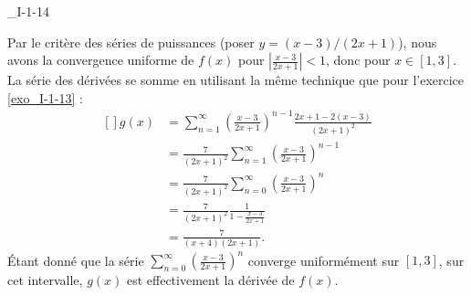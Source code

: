 

\begin{corrige}{_I-1-14}

Par le critère des séries de puissances (poser $y=(x-3)/(2x+1)$), nous avons la convergence uniforme de $f(x)$ pour $\left| \frac{ x-3 }{ 2x+1 } \right|<1$, donc pour $x\in[1,3]$. La série des dérivées se somme en utilisant la même technique que pour l'exercice \ref{exo_I-1-13} :
\begin{equation}
	\begin{aligned}[]
		g(x)&=\sum_{n=1}^{\infty}\left( \frac{ x-3 }{ 2x+1 } \right)^{n-1}\frac{ 2x+1-2(x-3) }{ (2x+1)^2 }\\
			&= \frac{ 7 }{ (2x+1)^2 }\sum_{n=1}^{\infty}\left( \frac{ x-3 }{ 2x+1 } \right)^{n-1}\\
			&= \frac{ 7 }{ (2x+1)^2 }\sum_{n=0}^{\infty}\left( \frac{ x-3 }{ 2x+1 } \right)^{n}\\
			&=\frac{ 7 }{ (2x+1)^2 }\frac{1}{ 1-\frac{ x-3 }{ 2x+1 } }\\
			&=\frac{ 7 }{ (x+4)(2x+1) }.
	\end{aligned}
\end{equation}
Étant donné que la série $\sum_{n=0}^{\infty}\left( \frac{ x-3 }{ 2x+1 } \right)^n$ converge uniformément sur $[1,3]$, sur cet intervalle, $g(x)$ est effectivement la dérivée de $f(x)$.

\end{corrige}

